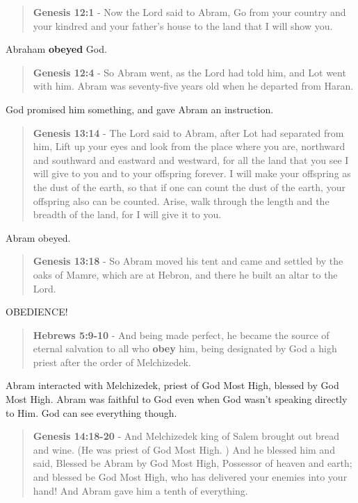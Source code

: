 \documentclass[11pt]{article}
\begin{document}
\begin{quote}
\textbf{Genesis 12:1} - Now the Lord said to Abram, Go from your country and your kindred and your father's house to the land that I will show you.
\end{quote}

Abraham \textbf{obeyed} God.

\begin{quote}
\textbf{Genesis 12:4} - So Abram went, as the Lord had told him, and Lot went with him. Abram was seventy-five years old when he departed from Haran.
\end{quote}

God promised him something, and gave Abram an instruction.

\begin{quote}
\textbf{Genesis 13:14} - The Lord said to Abram, after Lot had separated from him, Lift up your eyes and look from the place where you are, northward and southward and eastward and westward, for all the land that you see I will give to you and to your offspring forever. I will make your offspring as the dust of the earth, so that if one can count the dust of the earth, your offspring also can be counted. Arise, walk through the length and the breadth of the land, for I will give it to you.
\end{quote}

Abram obeyed.

\begin{quote}
\textbf{Genesis 13:18} - So Abram moved his tent and came and settled by the oaks of Mamre, which are at Hebron, and there he built an altar to the Lord.
\end{quote}

OBEDIENCE!

\begin{quote}
\textbf{Hebrews 5:9-10} - And being made perfect, he became the source of eternal salvation to all who \textbf{obey} him, being designated by God a high priest after the order of Melchizedek.
\end{quote}

Abram interacted with Melchizedek, priest of God Most High, blessed by God Most High. Abram was faithful to God even when God wasn't speaking directly to Him. God can see everything though.

\begin{quote}
\textbf{Genesis 14:18-20} - And Melchizedek king of Salem brought out bread and wine. (He was priest of God Most High. ) And he blessed him and said, Blessed be Abram by God Most High, Possessor of heaven and earth; and blessed be God Most High, who has delivered your enemies into your hand! And Abram gave him a tenth of everything.
\end{quote}
\end{document}
